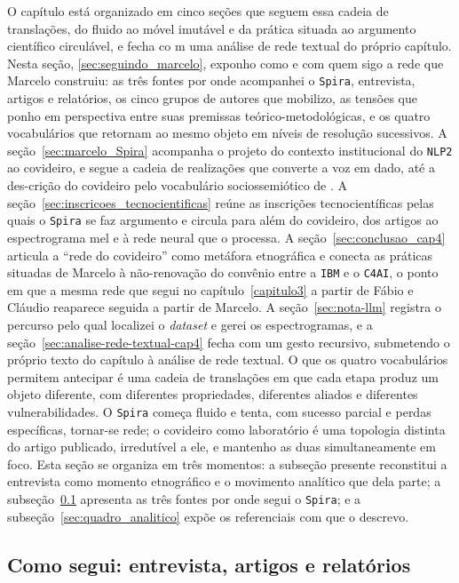 O capítulo está organizado em cinco seções que seguem essa cadeia de translações, do fluido ao móvel imutável e da prática situada ao argumento científico circulável, e fecha co
m uma análise de rede textual do próprio capítulo. Nesta seção, \ref{sec:seguindo_marcelo}, exponho como e com quem sigo a rede que Marcelo construiu: as três fontes por onde acompanhei o \texttt{Spira}, entrevista, artigos e relatórios, os cinco grupos de autores que mobilizo, as tensões que ponho em perspectiva entre suas premissas teórico-metodológicas, e os quatro vocabulários que retornam ao mesmo objeto em níveis de resolução sucessivos. A seção~\ref{sec:marcelo_Spira} acompanha o projeto do contexto institucional do \texttt{NLP2} ao covideiro, e segue a cadeia de realizações que converte a voz em dado, até a des-crição do covideiro pelo vocabulário sociossemiótico de \textcite{Akrich1992Description}. A seção~\ref{sec:inscricoes_tecnocientificas} reúne as inscrições tecnocientíficas pelas quais o \texttt{Spira} se faz argumento e circula para além do covideiro, dos artigos ao espectrograma mel e à rede neural que o processa. A seção~\ref{sec:conclusao_cap4} articula a \enquote{rede do covideiro} como metáfora etnográfica e conecta as práticas situadas de Marcelo à não-renovação do convênio entre a \texttt{IBM} e o \texttt{C4AI}, o ponto em que a mesma rede que segui no capítulo~\ref{capitulo3} a partir de Fábio e Cláudio reaparece seguida a partir de Marcelo. A seção~\ref{sec:nota-llm} registra o percurso pelo qual localizei o \textit{dataset} e gerei os espectrogramas, e a seção~\ref{sec:analise-rede-textual-cap4} fecha com um gesto recursivo, submetendo o próprio texto do capítulo à análise de rede textual. O que os quatro vocabulários permitem antecipar é uma cadeia de translações em que cada etapa produz um objeto diferente, com diferentes propriedades, diferentes aliados e diferentes vulnerabilidades. O \texttt{Spira} começa fluido e tenta, com sucesso parcial e perdas específicas, tornar-se rede; o covideiro como laboratório é uma topologia distinta do artigo publicado, irredutível a ele, e mantenho as duas simultaneamente em foco. Esta seção se organiza em três momentos: a subseção presente reconstitui a entrevista como momento etnográfico e o movimento analítico que dela parte; a subseção~\ref{subsec:fontes_cap4} apresenta as três fontes por onde segui o \texttt{Spira}; e a subseção~\ref{sec:quadro_analitico} expõe os referenciais com que o descrevo.

\subsection{Como segui: entrevista, artigos e relatórios}
\label{subsec:fontes_cap4}

